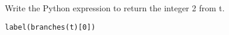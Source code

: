 \begin{blocksection}
\question Write the Python expression to return the integer 2 from t.

\begin{solution}
\begin{lstlisting}
label(branches(t)[0])
\end{lstlisting}
\end{solution}
\end{blocksection}
